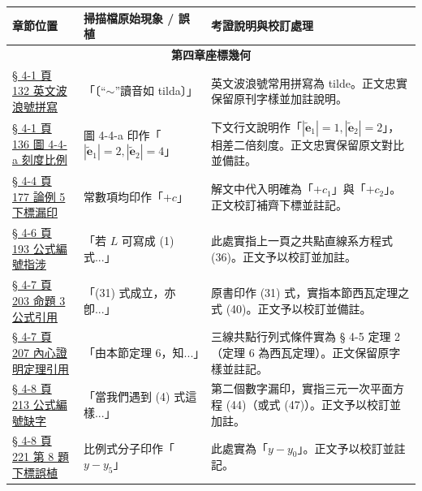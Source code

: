 \documentclass[a4paper,12pt,twoside]{article}
\begin{document}
\begin{table}[H]
\centering
\small
\renewcommand{\arraystretch}{1.35}
\begin{tabularx}{\textwidth}{|p{3.0cm}|p{3.8cm}|X|}
\hline
\textbf{章節位置} & \textbf{掃描檔原始現象 / 誤植} & \textbf{考證說明與校訂處理} \\ \hline

\multicolumn{3}{|c|}{\textbf{第四章\quad 座標幾何}} \\ \hline

\hyperref[note:b3s-ch4-p132-tilde-pronounce]{§ 4-1 頁 132 英文波浪號拼寫} & 
「〔“$\sim$”讀音如 tilda〕」 & 
英文波浪號常用拼寫為 tilde。正文忠實保留原刊字樣並加註說明。 \\ \hline

\hyperref[note:b3s-ch4-p136-fig4-4-a-scale]{§ 4-1 頁 136 圖 4-4-a 刻度比例} & 
圖 4-4-a 印作「$|\tilde{\mathbf{e}}_1|=2, |\tilde{\mathbf{e}}_2|=4$」 & 
下文行文說明作「$|\tilde{\mathbf{e}}_1|=1, |\tilde{\mathbf{e}}_2|=2$」，相差二倍刻度。正文忠實保留原文對比並備註。 \\ \hline

\hyperref[note:b3s-ch4-p177-l1-l2-subscripts]{§ 4-4 頁 177 論例 5 下標漏印} & 
常數項均印作「$+c$」 & 
解文中代入明確為「$+c_1$」與「$+c_2$」。正文校訂補齊下標並註記。 \\ \hline

\hyperref[note:b3s-ch4-p193-formula-ref]{§ 4-6 頁 193 公式編號指涉} & 
「若 $L$ 可寫成 (1) 式...」 & 
此處實指上一頁之共點直線系方程式 (36)。正文予以校訂並加註。 \\ \hline

\hyperref[note:b3s-ch4-p203-ceva-ref]{§ 4-7 頁 203 命題 3 公式引用} & 
「(31) 式成立，亦卽...」 & 
原書印作 (31) 式，實指本節西瓦定理之式 (40)。正文予以校訂並備註。 \\ \hline

\hyperref[note:b3s-ch4-p207-theorem-ref]{§ 4-7 頁 207 內心證明定理引用} & 
「由本節定理 6，知...」 & 
三線共點行列式條件實為 § 4-5 定理 2（定理 6 為西瓦定理）。正文保留原字樣並註記。 \\ \hline

\hyperref[note:b3s-ch4-p213-equation-ref]{§ 4-8 頁 213 公式編號缺字} & 
「當我們遇到 (4) 式這樣...」 & 
第二個數字漏印，實指三元一次平面方程 (44)（或式 (47)）。正文予以校訂並加註。 \\ \hline

\hyperref[note:b3s-ch4-p221-subscript-typo]{§ 4-8 頁 221 第 8 題下標誤植} & 
比例式分子印作「$y - y_5$」 & 
此處實為「$y - y_0$」。正文予以校訂並註記。 \\ \hline

\end{tabularx}
\end{table}
\end{document}
